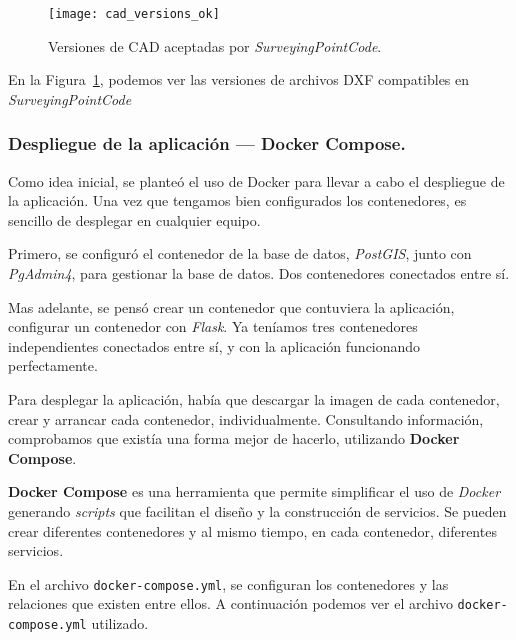 \begin{figure}[!h]
	\centering
	\texttt{[image: cad\_versions\_ok]}
	\caption{Versiones de CAD aceptadas por \emph{SurveyingPointCode}.}
	\label{fig:cad_versions_ok}
\end{figure}


En la Figura~\ref{fig:cad_versions_ok}, podemos ver las versiones de archivos DXF
compatibles en \emph{SurveyingPointCode}

\subsubsection{Despliegue de la aplicación --- Docker Compose.}

Como idea inicial, se planteó el uso de Docker para llevar a cabo el despliegue de la aplicación. Una vez que tengamos bien configurados los contenedores, es sencillo de desplegar en cualquier equipo.

Primero, se configuró el contenedor  de la base de datos, \emph{PostGIS}, junto con \emph{PgAdmin4}, para gestionar la base de datos. Dos contenedores conectados entre sí.

Mas adelante, se pensó crear un contenedor que contuviera la aplicación, configurar un contenedor con \emph{Flask}. Ya teníamos tres contenedores independientes conectados entre sí, y con la aplicación funcionando perfectamente.

Para desplegar la aplicación, había que descargar la imagen de cada contenedor, crear y arrancar cada contenedor, individualmente. Consultando información, comprobamos que existía una forma mejor de hacerlo, utilizando \textbf{Docker Compose}. 

\textbf{Docker Compose} es una herramienta que permite simplificar el uso de \emph{Docker} generando \emph{scripts} que facilitan el diseño y la construcción de servicios. Se pueden crear diferentes contenedores y al mismo tiempo, en cada contenedor, diferentes servicios.

En el archivo \texttt{docker-compose.yml}, se configuran los contenedores y las relaciones que existen entre ellos. A continuación podemos ver el archivo \texttt{docker-compose.yml} utilizado.

